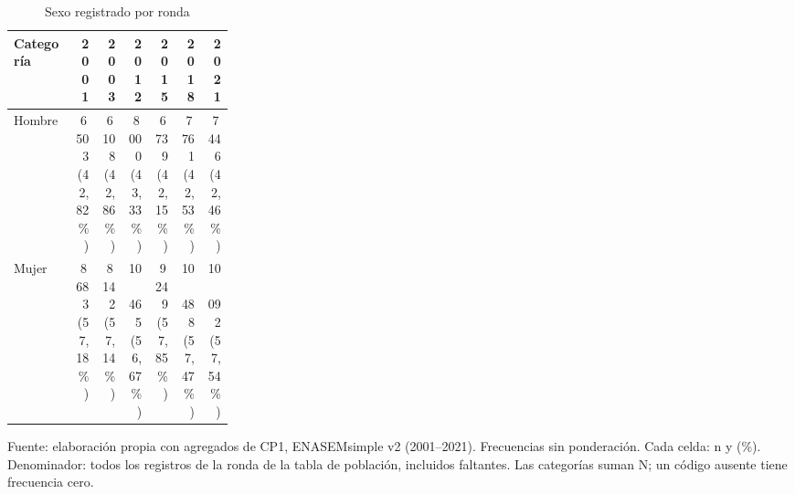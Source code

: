 \begin{table}[!htbp]
\centering
\caption{Sexo registrado por ronda}\label{tab:cp1-sexo}
\small\setlength{\tabcolsep}{4pt}
\renewcommand{\arraystretch}{1.15}
\begin{tabular}{p{0.28\linewidth}rrrrrr}
\toprule
\textbf{Categoría} & \textbf{2001} & \textbf{2003} & \textbf{2012} & \textbf{2015} & \textbf{2018} & \textbf{2021} \\
\midrule
Hombre & \shortstack[r]{6\,503\\(42,82\%)} & \shortstack[r]{6\,108\\(42,86\%)} & \shortstack[r]{8\,000\\(43,33\%)} & \shortstack[r]{6\,739\\(42,15\%)} & \shortstack[r]{7\,761\\(42,53\%)} & \shortstack[r]{7\,446\\(42,46\%)} \\
Mujer & \shortstack[r]{8\,683\\(57,18\%)} & \shortstack[r]{8\,142\\(57,14\%)} & \shortstack[r]{10\,465\\(56,67\%)} & \shortstack[r]{9\,249\\(57,85\%)} & \shortstack[r]{10\,488\\(57,47\%)} & \shortstack[r]{10\,092\\(57,54\%)} \\
\bottomrule
\end{tabular}
\par\medskip
\parbox{\linewidth}{\footnotesize Fuente: elaboración propia con agregados de CP1, ENASEMsimple v2 (2001--2021). Frecuencias sin ponderación. Cada celda: n y (\%). Denominador: todos los registros de la ronda de la tabla de población, incluidos faltantes. Las categorías suman N; un código ausente tiene frecuencia cero.}
\end{table}
